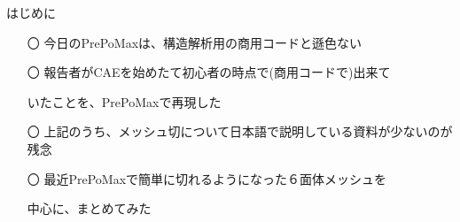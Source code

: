 \begin{frame}{はじめに}
  \begin{itemize}[itemsep=2.5ex, leftmargin=3mm]
      \large
      \item[〇] 今日のPrePoMaxは、構造解析用の商用コードと遜色ない

      \item[〇] 報告者がCAEを始めたて初心者の時点で(商用コードで)出来て

                いたことを、PrePoMaxで再現した

      \item[〇] 上記のうち、メッシュ切について日本語で説明している資料が少ないのが残念

      \item[〇] 最近PrePoMaxで簡単に切れるようになった６面体メッシュを

                中心に、まとめてみた
  \end{itemize}
\end{frame}
